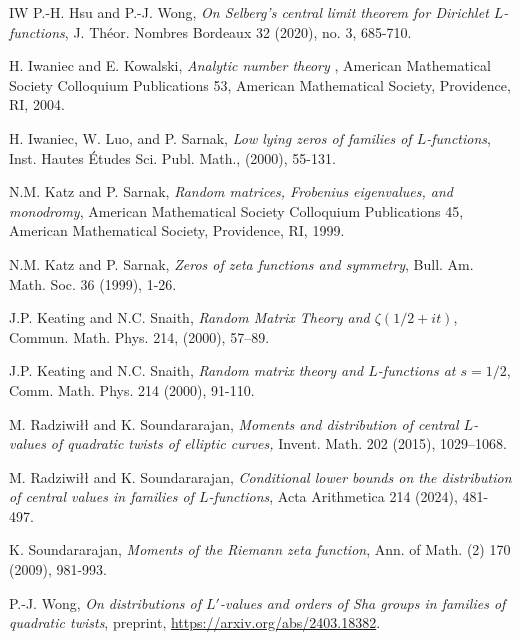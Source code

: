 \documentclass[11pt]{amsart}
\numberwithin{equation}{section}
\theoremstyle{remark}
\begin{document}
\begin{thebibliography}{IW}
 P.-H. Hsu and P.-J. Wong, {\it On Selberg's central limit theorem for Dirichlet $L$-functions}, J. Th\'eor. Nombres Bordeaux 32 (2020), no. 3, 685-710.

 H. Iwaniec and E. Kowalski, {\it  Analytic number theory} , American Mathematical Society Colloquium Publications 53, American Mathematical Society, Providence, RI, 2004.

H. Iwaniec, W. Luo, and P. Sarnak, {\it  Low lying zeros of families of $L$-functions}, Inst. Hautes \'Etudes Sci.
Publ. Math., (2000),  55-131.


 N.M. Katz and P. Sarnak, {\it Random matrices, Frobenius eigenvalues, and monodromy}, American Mathematical Society Colloquium Publications 45,  American Mathematical Society, Providence, RI, 1999.

 N.M. Katz and P. Sarnak, {\it Zeros of zeta functions and symmetry}, Bull. Am. Math. Soc. 36 (1999), 1-26.

 J.P. Keating and N.C. Snaith, {\it Random Matrix Theory and $\zeta(1/2+it)$}, Commun. Math. Phys. 214, (2000), 57–89.

 J.P. Keating and N.C. Snaith, {\it Random matrix theory and $L$-functions at $s = 1/2$}, Comm. Math. Phys. 214 (2000), 91-110.



 M. {Radziwi\l\l} and K. Soundararajan, {\it Moments and distribution of central $L$-values of quadratic twists of elliptic curves,}  Invent. Math. 202 (2015), 1029–1068.

 M. {Radziwi\l\l} and K. Soundararajan, {\it Conditional lower bounds on the distribution of central values in families of $L$-functions}, Acta Arithmetica 214 (2024), 481-497.



 K. Soundararajan, {\it Moments of the Riemann zeta function}, Ann. of Math. (2) 170 (2009),  981-993.


P.-J. Wong, {\it On distributions of $L'$-values and orders of Sha groups in families of quadratic twists},  preprint, \url{https://arxiv.org/abs/2403.18382}. 



\end{thebibliography}
\end{document}
